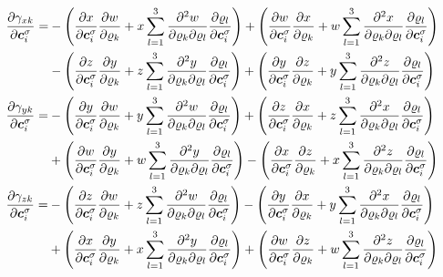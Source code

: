 \begin{align}
    &\begin{aligned}
        \frac{\partial{\gamma_{xk}}}{\partial{\bm{c}_i^{\sigma}}} = &-\left(\frac{\partial{x}}{\partial{\bm{c}_i^{\sigma}}}\frac{\partial{w}}{\partial{\varrho_k}} + x\sum_{l=1}^3\frac{\partial^2 w}{\partial \varrho_k \partial \varrho_l}\frac{\partial{\varrho_l}}{\partial{\bm{c}_i^{\sigma}}}\right) 
        + \left(\frac{\partial{w}}{\partial{\bm{c}_i^{\sigma}}}\frac{\partial{x}}{\partial{\varrho_k}} + w\sum_{l=1}^3\frac{\partial^2 x}{\partial \varrho_k \partial \varrho_l}\frac{\partial{\varrho_l}}{\partial{\bm{c}_i^{\sigma}}}\right) \\
        &- \left(\frac{\partial{z}}{\partial{\bm{c}_i^{\sigma}}}\frac{\partial{y}}{\partial{\varrho_k}} + z\sum_{l=1}^3\frac{\partial^2 y}{\partial \varrho_k \partial \varrho_l}\frac{\partial{\varrho_l}}{\partial{\bm{c}_i^{\sigma}}}\right) 
        + \left(\frac{\partial{y}}{\partial{\bm{c}_i^{\sigma}}}\frac{\partial{z}}{\partial{\varrho_k}} + y\sum_{l=1}^3\frac{\partial^2 z}{\partial \varrho_k \partial \varrho_l}\frac{\partial{\varrho_l}}{\partial{\bm{c}_i^{\sigma}}}\right)
    \end{aligned} \\
    &\begin{aligned}
        \frac{\partial{\gamma_{yk}}}{\partial{\bm{c}_i^{\sigma}}} = &-\left(\frac{\partial{y}}{\partial{\bm{c}_i^{\sigma}}}\frac{\partial{w}}{\partial{\varrho_k}} + y\sum_{l=1}^3\frac{\partial^2 w}{\partial \varrho_k \partial \varrho_l}\frac{\partial{\varrho_l}}{\partial{\bm{c}_i^{\sigma}}}\right) 
        + \left(\frac{\partial{z}}{\partial{\bm{c}_i^{\sigma}}}\frac{\partial{x}}{\partial{\varrho_k}} + z\sum_{l=1}^3\frac{\partial^2 x}{\partial \varrho_k \partial \varrho_l}\frac{\partial{\varrho_l}}{\partial{\bm{c}_i^{\sigma}}}\right) \\
        &+ \left(\frac{\partial{w}}{\partial{\bm{c}_i^{\sigma}}}\frac{\partial{y}}{\partial{\varrho_k}} + w\sum_{l=1}^3\frac{\partial^2 y}{\partial \varrho_k \partial \varrho_l}\frac{\partial{\varrho_l}}{\partial{\bm{c}_i^{\sigma}}}\right) 
        - \left(\frac{\partial{x}}{\partial{\bm{c}_i^{\sigma}}}\frac{\partial{z}}{\partial{\varrho_k}} + x\sum_{l=1}^3\frac{\partial^2 z}{\partial \varrho_k \partial \varrho_l}\frac{\partial{\varrho_l}}{\partial{\bm{c}_i^{\sigma}}}\right)
    \end{aligned} \\
    &\begin{aligned}
        \frac{\partial{\gamma_{zk}}}{\partial{\bm{c}_i^{\sigma}}} = &-\left(\frac{\partial{z}}{\partial{\bm{c}_i^{\sigma}}}\frac{\partial{w}}{\partial{\varrho_k}} + z\sum_{l=1}^3\frac{\partial^2 w}{\partial \varrho_k \partial \varrho_l}\frac{\partial{\varrho_l}}{\partial{\bm{c}_i^{\sigma}}}\right) 
        - \left(\frac{\partial{y}}{\partial{\bm{c}_i^{\sigma}}}\frac{\partial{x}}{\partial{\varrho_k}} + y\sum_{l=1}^3\frac{\partial^2 x}{\partial \varrho_k \partial \varrho_l}\frac{\partial{\varrho_l}}{\partial{\bm{c}_i^{\sigma}}}\right) \\
        &+ \left(\frac{\partial{x}}{\partial{\bm{c}_i^{\sigma}}}\frac{\partial{y}}{\partial{\varrho_k}} + x\sum_{l=1}^3\frac{\partial^2 y}{\partial \varrho_k \partial \varrho_l}\frac{\partial{\varrho_l}}{\partial{\bm{c}_i^{\sigma}}}\right) 
        + \left(\frac{\partial{w}}{\partial{\bm{c}_i^{\sigma}}}\frac{\partial{z}}{\partial{\varrho_k}} + w\sum_{l=1}^3\frac{\partial^2 z}{\partial \varrho_k \partial \varrho_l}\frac{\partial{\varrho_l}}{\partial{\bm{c}_i^{\sigma}}}\right)
    \end{aligned}
\end{align}

